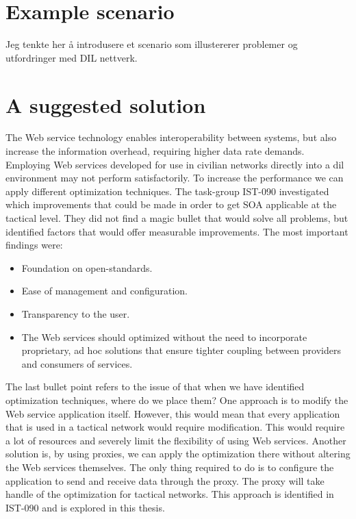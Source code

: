 \section{Example scenario}

Jeg tenkte her å introdusere et scenario som illustererer problemer og utfordringer
med DIL nettverk.


\section{A suggested solution}

The Web service technology enables interoperability between systems, but also
increase the information overhead, requiring higher data rate demands. Employing
Web services developed for use in civilian networks directly into a \gls{dil}
environment may not perform satisfactorily. To increase the performance we can
apply different optimization techniques. The task-group IST-090\cite{ist-090}
investigated which improvements that could be made in order to get SOA
applicable at the tactical level. They did not find a magic bullet that would
solve all problems, but identified factors that would offer measurable
improvements. The most important findings were:

\begin{itemize}
    \item Foundation on open-standards.
    \item Ease of management and configuration.
    \item Transparency to the user.
    \item The Web services should optimized without the need to incorporate proprietary, ad hoc solutions that ensure tighter coupling between providers and consumers of services.
\end{itemize}

The last bullet point refers to the issue of that when we have identified
optimization techniques, where do we place them? One approach is to modify the
Web service application itself. However, this would mean that every application
that is used in a tactical network would require modification. This would
require a lot of resources and severely limit the flexibility of using Web
services. Another solution is, by using proxies, we can apply the optimization
there without altering the Web services themselves. The only thing required to
do is to configure the application to send and receive data through the proxy.
The proxy will take handle of the optimization for tactical networks. This
approach is identified in IST-090 and  is explored in this thesis.

